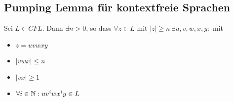 \subsection{Pumping Lemma für kontextfreie Sprachen}
\begin{Satz}
\label{satz:PL für CFL}
	Sei $L\in {CFL}$. Dann $\exists n>0$, so dass $\forall z\in L$ mit $|z|\geq n\ \exists u,v,w,x,y:$ mit
	\begin{itemize}
	\item $z=uvwxy$
	\item $|vwx|\leq n$
	\item $|vx|\geq 1$
	\item $\forall i \in \mathbb{N} : uv^iwx^iy\in L$
	\end{itemize}
\end{Satz}
